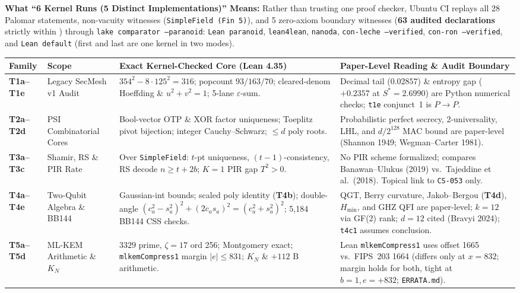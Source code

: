 \documentclass[10pt,letterpaper]{article}
\newcommand{\code}[1]{\texttt{\fontsize{7.8pt}{9.2pt}\selectfont #1}}
\begin{document}
\textbf{What ``6 Kernel Runs (5 Distinct Implementations)'' Means:} Rather than trusting one proof checker, Ubuntu CI replays all 28 Palomar statements, non-vacuity witnesses (\code{SimpleField (Fin 5)}), and 5 zero-axiom boundary witnesses (\textbf{63 audited declarations} strictly within \code{[propext, Classical.choice, Quot.sound]}) through \code{lake comparator --paranoid}: \code{Lean paranoid}, \code{lean4lean}, \code{nanoda}, \code{con-leche --verified}, \code{con-ron --verified}, and \code{Lean default} (first and last are one kernel in two modes).

\begin{table}[h!]
\centering
\vspace{-4pt}
\fontsize{7.3pt}{8.75pt}\selectfont
\renewcommand{\arraystretch}{1.07}
\begin{tabularx}{\linewidth}{@{}L{1.45cm} L{2.85cm} L{5.20cm} Y@{}}
\toprule
\textbf{Family} & \textbf{Scope} & \textbf{Exact Kernel-Checked Core (Lean 4.35)} & \textbf{Paper-Level Reading \& Audit Boundary} \\
\midrule
\textbf{T1a--T1e} & Legacy SecMesh v1 Audit & $354^2{-}8{\cdot}125^2{=}316$; popcount $93/163/70$; cleared-denom Hoeffding \& $u^2{+}v^2{=}1$; 5-lane $\varepsilon$-sum. & Decimal tail ($0.02857$) \& entropy gap ($+0.2357$ at $S^*{=}2.6990$) are Python numerical checks; \code{t1e} conjunct~1 is $P{\to}P$. \\
\textbf{T2a--T2d} & PSI Combinatorial Cores & Bool-vector OTP \& XOR factor uniqueness; Toeplitz pivot bijection; integer Cauchy--Schwarz; $\le d$ poly roots. & Probabilistic perfect secrecy, 2-universality, LHL, and $d/2^{128}$ MAC bound are paper-level (Shannon 1949; Wegman--Carter 1981). \\
\textbf{T3a--T3c} & Shamir, RS \& PIR Rate & Over \code{SimpleField}: $t$-pt uniqueness, $(t{-}1)$-consistency, RS decode $n{\ge}t{+}2b$; $K{=}1$ PIR gap $T^2{>}0$. & No PIR scheme formalized; compares Banawan--Ulukus (2019) vs.\ Tajeddine et al.\ (2018). Topical link to \code{CS-053} only. \\
\textbf{T4a--T4e} & Two-Qubit Algebra \& BB144 & Gaussian-int bounds; scaled poly identity (\textbf{T4b}); double-angle $(c_a^2{-}s_a^2)^2{+}(2c_as_a)^2{=}(c_a^2{+}s_a^2)^2$; 5,184 BB144 CSS checks. & QGT, Berry curvature, Jakob--Bergou (\textbf{T4d}), $H_{\min}$, and GHZ QFI are paper-level; $k{=}12$ via GF(2) rank; $d{=}12$ cited (Bravyi 2024); \code{t4c1} assumes conclusion. \\
\textbf{T5a--T5d} & ML-KEM Arithmetic \& $K_N$ & $3329$ prime, $\zeta{=}17$ ord 256; Montgomery exact; \code{mlkemCompress1} margin $|e|{\le}831$; $K_N$ \& $+112\text{ B}$ arithmetic. & Lean \code{mlkemCompress1} uses offset 1665 vs.\ FIPS~203 1664 (differs only at $x{=}832$; margin holds for both, tight at $b{=}1,e{=}{+}832$; \code{ERRATA.md}). \\

\end{tabularx}
\end{table}
\end{document}
